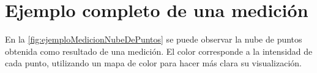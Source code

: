 \chapter{Ejemplo completo de una medición}\label{ch:appendixSampleScanImages}








En la \autoref{fig:ejemploMedicionNubeDePuntos} se puede observar la nube de puntos obtenida como resultado de una medición. El color corresponde a la intensidad de cada punto, utilizando un mapa de color para hacer más clara su visualización. 

